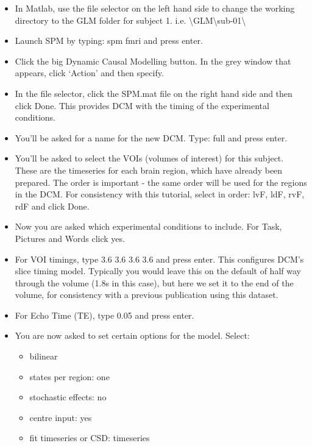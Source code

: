 \documentclass{article}
\begin{document}
\begin{itemize}
    
\item In Matlab, use the file selector on the left hand side to change the working directory to the GLM folder for subject 1. i.e. \textbackslash{GLM}\textbackslash{sub-01}\textbackslash

\item Launch SPM by typing: spm fmri and press enter.

\item Click the big Dynamic Causal Modelling button. In the grey window that appears, click `Action' and then specify.

\item In the file selector, click the SPM.mat file on the right hand side and then click Done. This provides DCM with the timing of the experimental conditions.

\item You'll be asked for a name for the new DCM. Type: full  and press enter.

\item You'll be asked to select the VOIs (volumes of interest) for this subject. These are the timeseries for each brain region, which have already been prepared. The order is important - the same order will be used for the regions in the DCM. For consistency with this tutorial, select in order: lvF, ldF, rvF, rdF and click Done.

\item Now you are asked which experimental conditions to include. For Task, Pictures and Words click yes.

\item For VOI timings, type 3.6  3.6  3.6  3.6 and press enter. This configures DCM's slice timing model. Typically you would leave this on the default of half way through the volume (1.8s in this case), but here we set it to the end of the volume, for consistency with a previous publication using this dataset.

\item For Echo Time (TE), type 0.05 and press enter.

\item You are now asked to set certain options for the model. Select: 

\begin{itemize}
    \item bilinear
    \item states per region: one
    \item stochastic effects: no
    \item centre input: yes
    \item fit timeseries or CSD: timeseries
\end{itemize}


\end{itemize}
\end{document}
